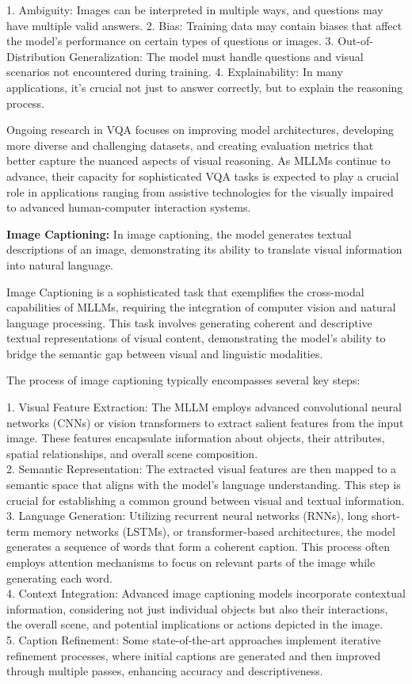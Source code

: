 1. Ambiguity: Images can be interpreted in multiple ways, and questions may have multiple valid answers.
2. Bias: Training data may contain biases that affect the model's performance on certain types of questions or images.
3. Out-of-Distribution Generalization: The model must handle questions and visual scenarios not encountered during training.
4. Explainability: In many applications, it's crucial not just to answer correctly, but to explain the reasoning process.

Ongoing research in VQA focuses on improving model architectures, developing more diverse and challenging datasets, and creating evaluation metrics that better capture the nuanced aspects of visual reasoning. As MLLMs continue to advance, their capacity for sophisticated VQA tasks is expected to play a crucial role in applications ranging from assistive technologies for the visually impaired to advanced human-computer interaction systems.

\textbf{Image Captioning:} In image captioning, the model generates textual descriptions of an image, demonstrating its ability to translate visual information into natural language.

Image Captioning is a sophisticated task that exemplifies the cross-modal capabilities of MLLMs, requiring the integration of computer vision and natural language processing. This task involves generating coherent and descriptive textual representations of visual content, demonstrating the model's ability to bridge the semantic gap between visual and linguistic modalities.

The process of image captioning typically encompasses several key steps:

1. Visual Feature Extraction: The MLLM employs advanced convolutional neural networks (CNNs) or vision transformers to extract salient features from the input image. These features encapsulate information about objects, their attributes, spatial relationships, and overall scene composition.
\\
2. Semantic Representation: The extracted visual features are then mapped to a semantic space that aligns with the model's language understanding. This step is crucial for establishing a common ground between visual and textual information.
\\
3. Language Generation: Utilizing recurrent neural networks (RNNs), long short-term memory networks (LSTMs), or transformer-based architectures, the model generates a sequence of words that form a coherent caption. This process often employs attention mechanisms to focus on relevant parts of the image while generating each word.
\\
4. Context Integration: Advanced image captioning models incorporate contextual information, considering not just individual objects but also their interactions, the overall scene, and potential implications or actions depicted in the image.
\\
5. Caption Refinement: Some state-of-the-art approaches implement iterative refinement processes, where initial captions are generated and then improved through multiple passes, enhancing accuracy and descriptiveness.

